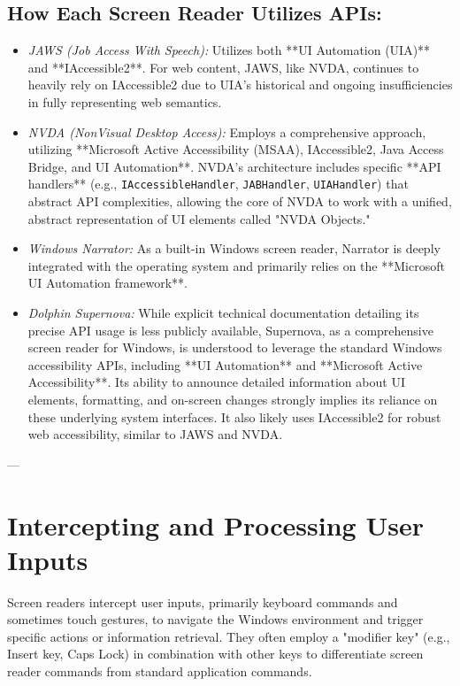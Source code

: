 \subsection*{How Each Screen Reader Utilizes APIs:}
\begin{itemize}
    \item \emph{JAWS (Job Access With Speech):} Utilizes both **UI Automation (UIA)** and **IAccessible2**. For web content, JAWS, like NVDA, continues to heavily rely on IAccessible2 due to UIA's historical and ongoing insufficiencies in fully representing web semantics.\cite{JantridIAccessible2}\cite{JAWSUIAScriptAPI}
    \item \emph{NVDA (NonVisual Desktop Access):} Employs a comprehensive approach, utilizing **Microsoft Active Accessibility (MSAA), IAccessible2, Java Access Bridge, and UI Automation**.\cite{NVDAAPIsClym}\cite{AssistivLabsNVDAArch} NVDA's architecture includes specific **API handlers** (e.g., \texttt{IAccessibleHandler}, \texttt{JABHandler}, \texttt{UIAHandler}) that abstract API complexities, allowing the core of NVDA to work with a unified, abstract representation of UI elements called "NVDA Objects."
    \item \emph{Windows Narrator:} As a built-in Windows screen reader, Narrator is deeply integrated with the operating system and primarily relies on the **Microsoft UI Automation framework**.\cite{NarratorTechDetails}
    \item \emph{Dolphin Supernova:} While explicit technical documentation detailing its precise API usage is less publicly available, Supernova, as a comprehensive screen reader for Windows, is understood to leverage the standard Windows accessibility APIs, including **UI Automation** and **Microsoft Active Accessibility**.\cite{SuperNovaMagnifierScreenReader} Its ability to announce detailed information about UI elements, formatting, and on-screen changes strongly implies its reliance on these underlying system interfaces. It also likely uses IAccessible2 for robust web accessibility, similar to JAWS and NVDA.
\end{itemize}

---

\section{Intercepting and Processing User Inputs}
\label{sec:intercepting-inputs}

Screen readers intercept user inputs, primarily keyboard commands and sometimes touch gestures, to navigate the Windows environment and trigger specific actions or information retrieval. They often employ a "modifier key" (e.g., Insert key, Caps Lock) in combination with other keys to differentiate screen reader commands from standard application commands.

